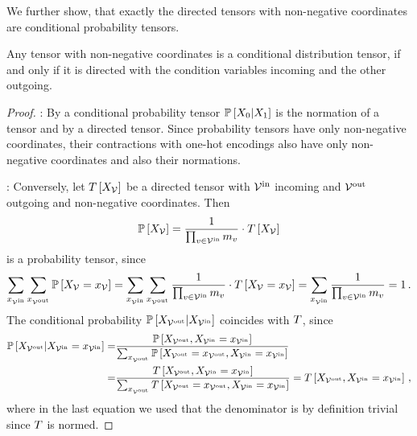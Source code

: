 We further show, that exactly the directed tensors with non-negative coordinates are conditional probability tensors.

\begin{theorem}
    \label{the:conditionalDirected}
    Any tensor with non-negative coordinates is a conditional distribution tensor, if and only if it is directed with the condition variables incoming and the other outgoing.
\end{theorem}
\begin{proof}
    \proofrightsymbol:
    By  a conditional probability tensor $\mathbb{P}\left[X_{0}|X_{1}\right]$ is the normation of a tensor and by  a directed tensor.
    Since probability tensors have only non-negative coordinates, their contractions with one-hot encodings also have only non-negative coordinates and also their normations.

    \proofleftsymbol:
    Conversely, let $T\left[X_{\mathcal{V}}\right]$ be a directed tensor with $\mathcal{V}^{\mathrm{in}}$ incoming and $\mathcal{V}^{\mathrm{out}}$ outgoing and non-negative coordinates.
    Then
    \begin{align}
        \mathbb{P}\left[X_{\mathcal{V}}\right] = \frac{1}{\prod_{v\in\mathcal{V}^{\mathrm{in}}}m_{v}} \cdot T\left[X_{\mathcal{V}}\right]
    \end{align}
    is a probability tensor, since
    \begin{align*}
        \sum_{x_{\mathcal{V}^{\mathrm{in}}}} \sum_{x_{\mathcal{V}^{\mathrm{out}}}} \mathbb{P}\left[X_{\mathcal{V}}=x_{\mathcal{V}}\right] =
        \sum_{x_{\mathcal{V}^{\mathrm{in}}}} \sum_{x_{\mathcal{V}^{\mathrm{out}}}} \frac{1}{\prod_{v\in\mathcal{V}^{\mathrm{in}}}m_{v}} \cdot T\left[X_{\mathcal{V}}=x_{\mathcal{V}}\right] =
        \sum_{x_{\mathcal{V}^{\mathrm{in}}}} \frac{1}{\prod_{v\in\mathcal{V}^{\mathrm{in}}}m_{v}} = 1 \, .
    \end{align*}
    The conditional probability $\mathbb{P}\left[X_{\mathcal{V}^{\mathrm{out}}}|X_{\mathcal{V}^{\mathrm{in}}}\right]$ coincides with $T$, since
    \begin{align*}
        \mathbb{P}\left[X_{\mathcal{V}^{\mathrm{out}}}|X_{\mathcal{V}^{\mathrm{in}}}=x_{\mathcal{V}^{\mathrm{in}}}\right]
        =& \frac{
            \mathbb{P}\left[X_{\mathcal{V}^{\mathrm{out}}},X_{\mathcal{V}^{\mathrm{in}}}=x_{\mathcal{V}^{\mathrm{in}}}\right]
        }{
            \sum_{x_{\mathcal{V}^{\mathrm{out}}}} \mathbb{P}\left[X_{\mathcal{V}^{\mathrm{out}}}=x_{\mathcal{V}^{\mathrm{out}}},X_{\mathcal{V}^{\mathrm{in}}}=x_{\mathcal{V}^{\mathrm{in}}}\right]
        } \\
        =& \frac{
            T\left[X_{\mathcal{V}^{\mathrm{out}}},X_{\mathcal{V}^{\mathrm{in}}}=x_{\mathcal{V}^{\mathrm{in}}}\right]
        }{
            \sum_{x_{\mathcal{V}^{\mathrm{out}}}} T\left[X_{\mathcal{V}^{\mathrm{out}}}=x_{\mathcal{V}^{\mathrm{out}}},X_{\mathcal{V}^{\mathrm{in}}}=x_{\mathcal{V}^{\mathrm{in}}}\right]
        }
        = T\left[X_{\mathcal{V}^{\mathrm{out}}},X_{\mathcal{V}^{\mathrm{in}}}=x_{\mathcal{V}^{\mathrm{in}}}\right] \, ,
    \end{align*}
    where in the last equation we used that the denominator is by definition trivial since $T$ is normed.
\end{proof}

